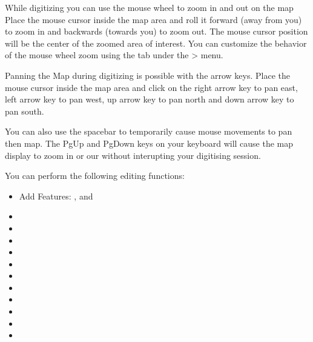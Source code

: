 
While digitizing you can use the mouse wheel to zoom in and out on the map 
Place the mouse cursor inside the map area and roll it forward (away from you) 
to zoom in and backwards (towards you) to zoom out. The mouse cursor position will 
be the center of the zoomed area of interest. You can customize the behavior 
of the mouse wheel zoom using the  tab under the  
> menu.


Panning the Map during digitizing is possible with the arrow keys. Place
the mouse cursor inside the map area and click on the right arrow key to
pan east, left arrow key to pan west, up arrow key to pan north and down arrow 
key to pan south.

You can also use the spacebar to temporarily cause mouse movements to pan 
then map. The PgUp and PgDown keys on your keyboard will cause the map 
display to zoom in or our without interupting your digitising session.

You can perform the following editing functions:

\begin{itemize}
\item Add Features: ,
   and
\item {}
\item {}
\item {}
\item {}
\item {}
\item {}
\item {}
\item {}
\item {}
\item {}
\item {}
\end{itemize}

